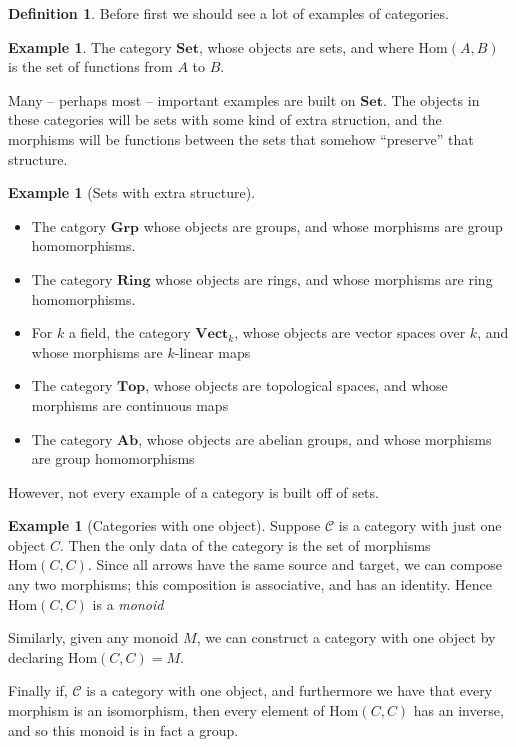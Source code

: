 \documentclass{amsart}
\theoremstyle{definition}
\newtheorem{example}[dummy]{Example}
\newtheorem{definition}[dummy]{Definition}
\begin{document}
\begin{definition}
Before first we should see a lot of examples of categories.

\begin{example} The category $\mathbf{Set}$, whose objects are sets, and where $\textrm{Hom}(A,B)$ is the set of functions from $A$ to $B$.
\end{example}

Many -- perhaps most -- important examples are built on $\mathbf{Set}$. The objects in these categories will be sets with some kind of extra struction, and the morphisms will be functions between the sets that somehow ``preserve'' that structure.

\begin{example}[Sets with extra structure]
  \begin{itemize}
\item The catgory $\textbf{Grp}$ whose objects are groups, and whose morphisms are group homomorphisms.
\item The category $\mathbf{Ring}$ whose objects are rings, and whose morphisms are ring homomorphisms.
\item For $k$ a field, the category $\mathbf{Vect}_k$, whose objects are vector spaces over $k$, and whose morphisms are $k$-linear maps
\item The category $\mathbf{Top}$, whose objects are topological spaces, and whose morphisms are continuous maps  
\item The category $\mathbf{Ab}$, whose objects are abelian groups, and whose morphisms are group homomorphisms
\end{itemize}
  \end{example}

However, not every example of a category is built off of sets.  

\begin{example}[Categories with one object]
Suppose $\mathcal{C}$ is a category with just one object $C$.  Then the only  data of the category is the set of morphisms $\mathrm{Hom}(C,C)$.   Since all arrows have the same source and target, we can compose any two morphisms; this composition is associative, and has an identity.  Hence $\mathrm{Hom}(C,C)$ is a \emph{monoid}

Similarly, given any monoid $M$, we can construct a category with one object by declaring $\textrm{Hom}(C,C)=M$.

Finally if, $\mathcal{C}$ is a category with one object, and furthermore we have that every morphism is an isomorphism, then every element of $\textrm{Hom}(C,C)$ has an inverse, and so this monoid is in fact a group. 


\end{example}
\end{definition}
\end{document}
